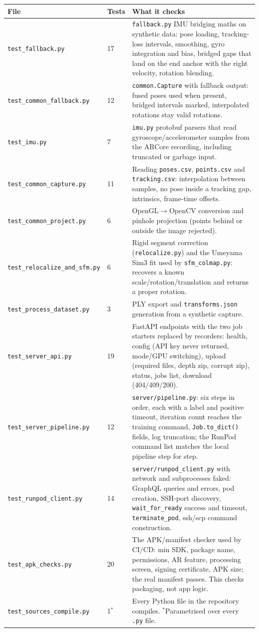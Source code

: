 \begin{longtable}{p{}p{}p{}}
\toprule
\textbf{File} & \textbf{Tests} & \textbf{What it checks} \\
\midrule
\endhead
\texttt{test\_fallback.py} & 17 & \texttt{fallback.py} IMU bridging maths on synthetic data: pose loading, tracking-loss intervals, smoothing, gyro integration and bias, bridged gaps that land on the end anchor with the right velocity, rotation blending. \\
\texttt{test\_common\_fallback.py} & 12 & \texttt{common.Capture} with fallback output: fused poses used when present, bridged intervals marked, interpolated rotations stay valid rotations. \\
\texttt{test\_imu.py} & 7 & \texttt{imu.py} protobuf parsers that read gyroscope/accelerometer samples from the ARCore recording, including truncated or garbage input. \\
\texttt{test\_common\_capture.py} & 11 & Reading \texttt{poses.csv}, \texttt{points.csv} and \texttt{tracking.csv}: interpolation between samples, no pose inside a tracking gap, intrinsics, frame-time offsets. \\
\texttt{test\_common\_project.py} & 6 & OpenGL$\rightarrow$OpenCV conversion and pinhole projection (points behind or outside the image rejected). \\
\texttt{test\_relocalize\_and\_sfm.py} & 6 & Rigid segment correction (\texttt{relocalize.py}) and the Umeyama Sim3 fit used by \texttt{sfm\_colmap.py}: recovers a known scale/rotation/translation and returns a proper rotation. \\
\texttt{test\_process\_dataset.py} & 3 & PLY export and \texttt{transforms.json} generation from a synthetic capture. \\
\texttt{test\_server\_api.py} & 19 & FastAPI endpoints with the two job starters replaced by recorders: health, config (API key never returned, mode/GPU switching), upload (required files, depth zip, corrupt zip), status, jobs list, download (404/409/200). \\
\texttt{test\_server\_pipeline.py} & 12 & \texttt{server/pipeline.py}: six steps in order, each with a label and positive timeout, iteration count reaches the training command, \texttt{Job.to\_dict()} fields, log truncation; the RunPod command list matches the local pipeline step for step. \\
\texttt{test\_runpod\_client.py} & 14 & \texttt{server/runpod\_client.py} with network and subprocesses faked: GraphQL queries and errors, pod creation, SSH-port discovery, \texttt{wait\_for\_ready} success and timeout, \texttt{terminate\_pod}, ssh/scp command construction. \\
\texttt{test\_apk\_checks.py} & 20 & The APK/manifest checker used by CI/CD: min SDK, package name, permissions, AR feature, processing screen, signing certificate, APK size; the real manifest passes. This checks packaging, not app logic. \\
\texttt{test\_sources\_compile.py} & 1$^{*}$ & Every Python file in the repository compiles. $^{*}$Parametrised over every \texttt{.py} file. \\
\bottomrule
\end{longtable}

